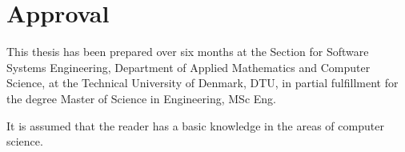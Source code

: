 \section*{Approval}
This thesis has been prepared over six months at the Section for Software Systems Engineering, Department of Applied Mathematics and Computer Science, at the Technical University of Denmark, DTU, in partial fulfillment for the degree Master of Science in Engineering, MSc Eng. 

It is assumed that the reader has a basic knowledge in the areas of computer science. 

\vfill

\begin{center}
\namesigdate{\thesisauthor~-~\studentnumber}
\end{center}

\vfill

